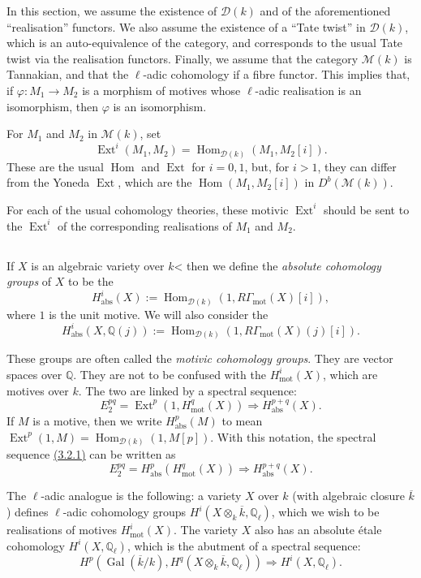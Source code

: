 \documentclass{article}
\theoremstyle{plain}
\theoremstyle{definition}
\newcommand{\scr}[1]{{\mathscr{#1}}}
\newcommand{\QQ}{\mathbb{Q}}
\newcommand{\mot}{\mathrm{mot}}
\newcommand{\abs}{\mathrm{abs}}
\DeclareMathOperator{\Hom}{Hom}
\DeclareMathOperator{\Ext}{Ext}
\DeclareMathOperator{\Gal}{Gal}
\newcommand{\oldpage}[1]{\marginpar{\footnotesize$\Big\vert$ \textit{p.~#1}}}
\begin{document}
In this section, we assume the existence of $\scr{D}(k)$ and of the aforementioned ``realisation'' functors.
We also assume the existence of a ``Tate twist'' in $\scr{D}(k)$, which is an auto-equivalence of the category, and corresponds to the usual Tate twist via the realisation functors.
Finally, we assume that the category $\scr{M}(k)$ is Tannakian, and that the $\ell$-adic cohomology if a fibre functor.
This implies that, if $\varphi\colon M_1\to M_2$ is a morphism of motives whose $\ell$-adic realisation is an isomorphism, then $\varphi$ is an isomorphism.

For $M_1$ and $M_2$ in $\scr{M}(k)$, set
\[
  \Ext^i(M_1,M_2) = \Hom_{\scr{D}(k)}(M_1,M_2[i]).
\]
\oldpage{155}
These are the usual $\Hom$ and $\Ext$ for $i=0,1$, but, for $i>1$, they can differ from the Yoneda $\Ext$, which are the $\Hom(M_1,M_2[i])$ in $D^b(\scr{M}(k))$.

For each of the usual cohomology theories, these motivic $\Ext^i$ should be sent to the $\Ext^i$ of the corresponding realisations of $M_1$ and $M_2$.


\subsection{}
\label{3.2}

If $X$ is an algebraic variety over $k$< then we define the \emph{absolute cohomology groups} of $X$ to be the
\[
  H^i_\abs(X) := \Hom_{\scr{D}(k)}(1,R\Gamma_\mot(X)[i]),
\]
where $1$ is the unit motive.
We will also consider the
\[
  H^i_\abs(X,\QQ(j)) := \Hom_{\scr{D}(k)}(1,R\Gamma_\mot(X)(j)[i]).
\]

These groups are often called the \emph{motivic cohomology groups}.
They are vector spaces over $\QQ$.
They are not to be confused with the $H^i_\mot(X)$, which are motives over $k$.
The two are linked by a spectral sequence:
\[
\label{3.2.1}
  E_2^{pq} = \Ext^p(1,H_\mot^q(X)) \Rightarrow H_\abs^{p+q}(X).
\tag{3.2.1}
\]
If $M$ is a motive, then we write $H^p_\abs(M)$ to mean $\Ext^p(1,M)=\Hom_{\scr{D}(k)}(1,M[p])$.
With this notation, the spectral sequence \hyperref[3.2.1]{(3.2.1)} can be written as
\[
\label{3.2.2}
  E_2^{pq} = H_\abs^p(H_\mot^q(X)) \Rightarrow H_\abs^{p+q}(X).
\tag{3.2.2}
\]

The $\ell$-adic analogue is the following:
a variety $X$ over $k$ (with algebraic closure $\overline{k}$) defines $\ell$-adic cohomology groups $H^i(X\otimes_k\overline{k},\QQ_\ell)$, which we wish to be realisations of motives $H_\mot^i(X)$.
The variety $X$ also has an absolute \'{e}tale cohomology $H^i(X,\QQ_\ell)$, which is the abutment of a spectral sequence:
\[
  H^p(\Gal(\overline{k}/k), H^q(X\otimes_k\overline{k},\QQ_\ell)) \Rightarrow H^i(X,\QQ_\ell).
\]
\end{document}
